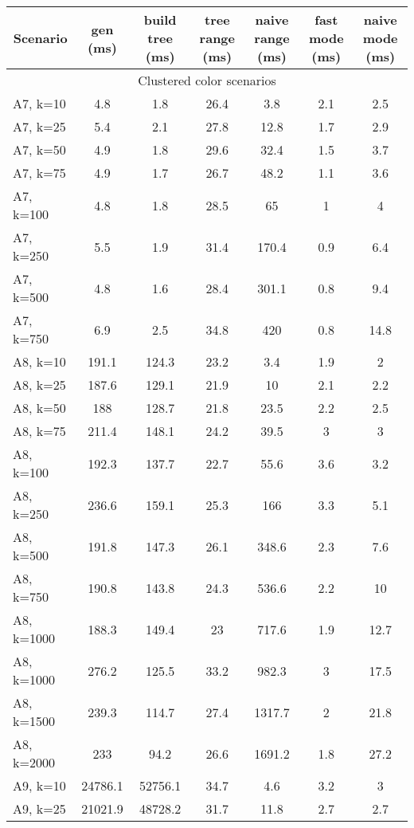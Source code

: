 \documentclass{article}
\begin{document}
\begin{center}
\begin{table}[h]
    \hskip0.8cm
    \begin{tabular}{|l||c|c|c|c|c|c|}
    \hline
    \multicolumn{1}{|c|}{Scenario} & gen (ms) & build tree (ms) & tree range (ms) & naive range (ms) & fast mode (ms) & naive mode (ms) \\
    \hline
    \hline
    \multicolumn{7}{|c|}{Clustered color scenarios} \\
    \hline
    A7, k=10 & 4.8 & 1.8 & 26.4 & 3.8 & 2.1 & 2.5\\
    A7, k=25 & 5.4 & 2.1 & 27.8 & 12.8 & 1.7 & 2.9\\
    A7, k=50 & 4.9 & 1.8 & 29.6 & 32.4 & 1.5 & 3.7\\
    A7, k=75 & 4.9 & 1.7 & 26.7 & 48.2 & 1.1 & 3.6\\
    A7, k=100 & 4.8 & 1.8 & 28.5 & 65 & 1 & 4\\
    A7, k=250 & 5.5 & 1.9 & 31.4 & 170.4 & 0.9 & 6.4\\
    A7, k=500 & 4.8 & 1.6 & 28.4 & 301.1 & 0.8 & 9.4\\
    A7, k=750 & 6.9 & 2.5 & 34.8 & 420 & 0.8 & 14.8\\
    \hline
    A8, k=10 & 191.1 & 124.3 & 23.2 & 3.4 & 1.9 & 2\\
    A8, k=25 & 187.6 & 129.1 & 21.9 & 10 & 2.1 & 2.2\\
    A8, k=50 & 188 & 128.7 & 21.8 & 23.5 & 2.2 & 2.5\\
    A8, k=75 & 211.4 & 148.1 & 24.2 & 39.5 & 3 & 3\\
    A8, k=100 & 192.3 & 137.7 & 22.7 & 55.6 & 3.6 & 3.2\\
    A8, k=250 & 236.6 & 159.1 & 25.3 & 166 & 3.3 & 5.1\\
    A8, k=500 & 191.8 & 147.3 & 26.1 & 348.6 & 2.3 & 7.6\\
    A8, k=750 & 190.8 & 143.8 & 24.3 & 536.6 & 2.2 & 10\\
    A8, k=1000 & 188.3 & 149.4 & 23 & 717.6 & 1.9 & 12.7\\
    A8, k=1000 & 276.2 & 125.5 & 33.2 & 982.3 & 3 & 17.5\\
    A8, k=1500 & 239.3 & 114.7 & 27.4 & 1317.7 & 2 & 21.8\\
A8, k=2000 & 233 & 94.2 & 26.6 & 1691.2 & 1.8 & 27.2\\
    \hline
    A9, k=10 & 24786.1 & 52756.1 & 34.7 & 4.6 & 3.2 & 3\\
    A9, k=25 & 21021.9 & 48728.2 & 31.7 & 11.8 & 2.7 & 2.7\\

\end{tabular}
\end{table}
\end{center}
\end{document}
